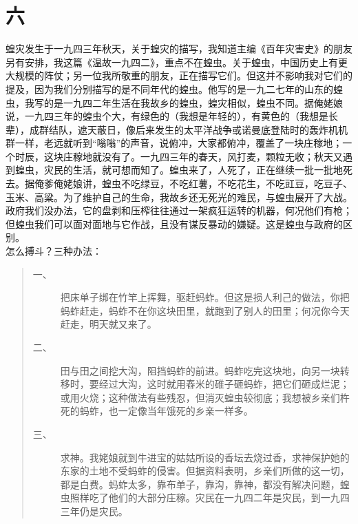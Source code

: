 \fancyhead[RO]{\thepage} %
\fancyhead[LE]{\thepage} %
\fancyfoot[LE,RO]{}
\fancyfoot[LO,CE]{}
\fancyfoot[CO,RE]{}
\chapter*{六}
蝗灾发生于一九四三年秋天，关于蝗灾的描写，我知道主编《百年灾害史》的朋友另有安排，我这篇《温故一九四二》，重点不在蝗虫。关于蝗虫，中国历史上有更大规模的阵仗；另一位我所敬重的朋友，正在描写它们。但这并不影响我对它们的提及，因为我们分别描写的是不同年代的蝗虫。他写的是一九二七年的山东的蝗虫，我写的是一九四二年生活在我故乡的蝗虫，蝗灾相似，蝗虫不同。据俺姥娘说，一九四三年的蝗虫个大，有绿色的（我想是年轻的），有黄色的（我想是长辈），成群结队，遮天蔽日，像后来发生的太平洋战争或诺曼底登陆时的轰炸机机群一样，老远就听到“嗡嗡”的声音，说俯冲，大家都俯冲，覆盖了一块庄稼地；一个时辰，这块庄稼地就没有了。一九四三年的春天，风打麦，颗粒无收；秋天又遇到蝗虫，灾民的生活，就可想而知了。蝗虫来了，人死了，正在继续一批一批地死去。据俺爹俺姥娘讲，蝗虫不吃绿豆，不吃红薯，不吃花生，不吃豇豆，吃豆子、玉米、高粱。为了维护自己的生命，我故乡还无死光的难民，与蝗虫展开了大战。政府我们没办法，它的盘剥和压榨往往通过一架疯狂运转的机器，何况他们有枪；但蝗虫我们可以面对面地与它作战，且没有谋反暴动的嫌疑。这是蝗虫与政府的区别。\\

怎么搏斗？三种办法：\\

\begin{quote}
		\begin{description}
		\item [一、] 把床单子绑在竹竿上挥舞，驱赶蚂蚱。但这是损人利己的做法，你把蚂蚱赶走，蚂蚱不在你这块田里，就跑到了别人的田里；何况你今天赶走，明天就又来了。\\
		
		\item [二、] 田与田之间挖大沟，阻挡蚂蚱的前进。蚂蚱吃完这块地，向另一块转移时，要经过大沟，这时就用舂米的碓子砸蚂蚱，把它们砸成烂泥；或用火烧；这种做法有些残忍，但消灭蝗虫较彻底；我想被乡亲们杵死的蚂蚱，也一定像当年饿死的乡亲一样多。\\
		
		\item [三、] 求神。我姥娘就到牛进宝的姑姑所设的香坛去烧过香，求神保护她的东家的土地不受蚂蚱的侵害。但据资料表明，乡亲们所做的这一切，都是白费。蚂蚱太多，靠布单子，靠沟，靠神，都没有解决问题，蝗虫照样吃了他们的大部分庄稼。灾民在一九四二年是灾民，到一九四三年仍是灾民。\\
	\end{description}
\end{quote}


